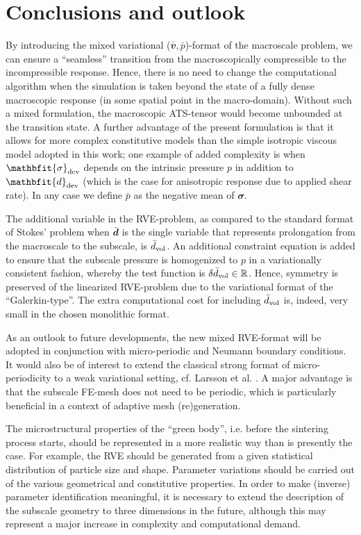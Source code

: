 \documentclass[12pt,a4paper,fleqn]{article}
\renewcommand{\ts}[1]{\mathbfit{#1}}
\begin{document}
\section{Conclusions and outlook}\label{sec:conlusions}

By introducing the mixed variational ($\bar{\ts v},\bar{p}$)-format of the macroscale problem, we can ensure a ``seamless'' transition from the macroscopically compressible to the incompressible response.
Hence, there is no need to change the computational algorithm when the simulation is taken beyond the state of a fully dense macroscopic response (in some spatial point in the macro-domain).
Without such a mixed formulation, the macroscopic ATS-tensor would become unbounded at the transition state.
A further advantage of the present formulation is that it allows for more complex constitutive models than the simple isotropic viscous model adopted in this work; one example of added complexity is when $\ts\sigma_\dev$ depends on the intrinsic pressure $p$ in addition to $\ts d_\dev$ (which is the case for anisotropic response due to applied shear rate).
In any case we define $\bar{p}$ as the negative mean of $\ts\sigma$.

The additional variable in the RVE-problem, as compared to the standard format of Stokes' problem when $\bar{\ts d}$ is the single variable that represents prolongation from the macroscale to the subscale, is $\bar d_{\mathrm{vol}}$. An additional constraint equation is added to ensure that the subscale pressure is homogenized to $p$ in a variationally consistent fashion, whereby the test function is $\delta\bar d_{\mathrm{vol}}\in\mathbb{R}$.
Hence, symmetry is preserved of  the linearized RVE-problem due to the variational format of the ``Galerkin-type''.
The extra computational cost for including $\bar d_{\mathrm{vol}}$ is, indeed, very small in the chosen monolithic format.

As an outlook to future developments, the new mixed RVE-format will be adopted in conjunction with micro-periodic and Neumann boundary conditions.
It would also be of interest to extend the classical strong format of micro-periodicity to a weak variational setting, cf. Larsson et al. \cite{Larsson_etal2011}.
A major advantage is that the subscale FE-mesh does not need to be periodic, which is particularly beneficial in a context of adaptive mesh (re)generation.

The microstructural properties of the ``green body'', i.e. before the sintering process starts, should be represented in a more realistic way than is presently the case.
For example, the RVE should be generated from a given statistical distribution of particle size and shape.
Parameter variations should be carried out of the various geometrical and constitutive properties.
In order to make (inverse) parameter identification meaningful, it is necessary to extend the description of the subscale geometry to three dimensions in the future, although this may represent a major increase in complexity and computational demand.
\end{document}
